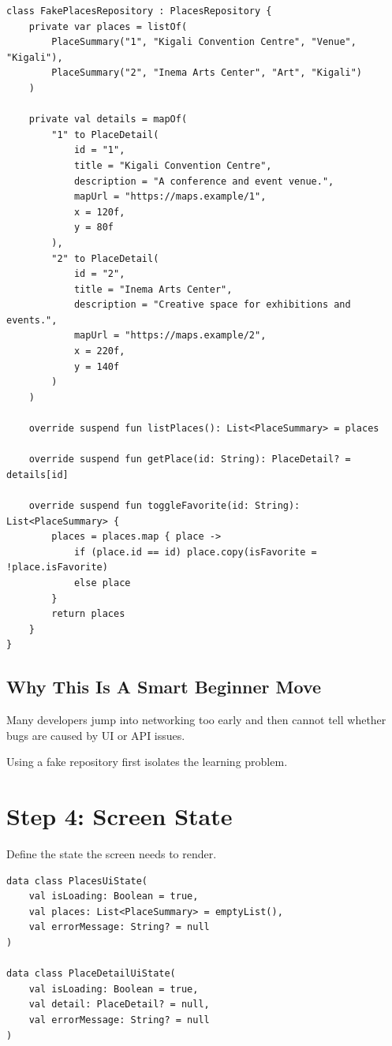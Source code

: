 \documentclass[11pt,a4paper]{article}
\begin{document}
\begin{lstlisting}[style=kazekotlin]
class FakePlacesRepository : PlacesRepository {
    private var places = listOf(
        PlaceSummary("1", "Kigali Convention Centre", "Venue", "Kigali"),
        PlaceSummary("2", "Inema Arts Center", "Art", "Kigali")
    )

    private val details = mapOf(
        "1" to PlaceDetail(
            id = "1",
            title = "Kigali Convention Centre",
            description = "A conference and event venue.",
            mapUrl = "https://maps.example/1",
            x = 120f,
            y = 80f
        ),
        "2" to PlaceDetail(
            id = "2",
            title = "Inema Arts Center",
            description = "Creative space for exhibitions and events.",
            mapUrl = "https://maps.example/2",
            x = 220f,
            y = 140f
        )
    )

    override suspend fun listPlaces(): List<PlaceSummary> = places

    override suspend fun getPlace(id: String): PlaceDetail? = details[id]

    override suspend fun toggleFavorite(id: String): List<PlaceSummary> {
        places = places.map { place ->
            if (place.id == id) place.copy(isFavorite = !place.isFavorite)
            else place
        }
        return places
    }
}
\end{lstlisting}

\subsection{Why This Is A Smart Beginner Move}

Many developers jump into networking too early and then cannot tell whether bugs are caused by UI or API issues.

Using a fake repository first isolates the learning problem.

\section{Step 4: Screen State}

Define the state the screen needs to render.

\begin{lstlisting}[style=kazekotlin]
data class PlacesUiState(
    val isLoading: Boolean = true,
    val places: List<PlaceSummary> = emptyList(),
    val errorMessage: String? = null
)

data class PlaceDetailUiState(
    val isLoading: Boolean = true,
    val detail: PlaceDetail? = null,
    val errorMessage: String? = null
)
\end{lstlisting}
\end{document}
